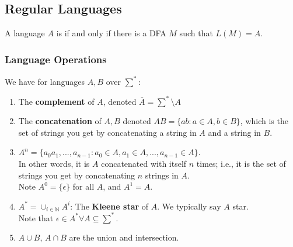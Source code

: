 \documentclass{article}
\begin{document}
    \subsection{Regular Languages}
    A language $A$ is  if and only if there is a DFA $M$ such that $L(M) = A$.
    
    \subsubsection{Language Operations}
    We have for languages $A,B$ over $\sum^*$:
    \begin{enumerate}
    \item The \textbf{complement} of $A$, denoted $\overline{A} = \sum^* \setminus A$
    
    \item The \textbf{concatenation} of $A, B$ denoted $AB = \{ab: a \in A, b \in B\}$, which is the set of strings you get by concatenating a string in $A$ and a string in $B$.
    
    \item $A^n = \{a_0a_1, ..., a_{n-1} : a_0 \in A, a_1 \in A, ..., a_{n-1} \in A\}$.\\
    In other words, it is $A$ concatenated with itself $n$ times; i.e., it is the set of strings you get by concatenating $n$ strings in $A$.\\
    Note $A^0 = \{\epsilon\}$ for all $A$, and $A^1 = A$.
    
    \item $A^* = \cup_{i\in\mathbb{N}}A^i$: The \textbf{Kleene star} of $A$. We typically say $A$ star.\\
    Note that $\epsilon \in A^* \forall A \subseteq \sum^*$.
    
    \item $A \cup B$, $A \cap B$ are the union and intersection.
    \end{enumerate}
    
\end{document}
